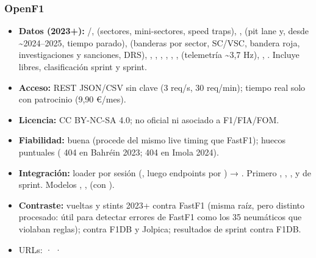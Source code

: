\subsubsection{OpenF1}

\begin{itemize}
\item \textbf{Datos (2023+):} /,  (sectores, mini-sectores, speed traps), ,  (pit lane y, desde \textasciitilde{}2024–2025, tiempo parado),  (banderas por sector, SC/VSC, bandera roja, investigaciones y sanciones, DRS), , , , , , ,  (telemetría \textasciitilde{}3,7 Hz), , . Incluye libres, clasificación sprint y sprint.
\item \textbf{Acceso:} REST JSON/CSV sin clave (3 req/s, 30 req/min); tiempo real solo con patrocinio (9,90 €/mes).
\item \textbf{Licencia:} CC BY-NC-SA 4.0; no oficial ni asociado a F1/FIA/FOM.
\item \textbf{Fiabilidad:} buena (procede del mismo live timing que FastF1); huecos puntuales ( 404 en Bahréin 2023;  404 en Imola 2024).
\item \textbf{Integración:} loader por sesión (, luego endpoints por ) → . Primero , , ,  y  de sprint. Modelos , ,  (con ).
\item \textbf{Contraste:} vueltas y stints 2023+ contra FastF1 (misma raíz, pero distinto procesado: útil para detectar errores de FastF1 como los 35 neumáticos que violaban reglas);  contra F1DB y Jolpica; resultados de sprint contra F1DB.
\item URLs: \href{https://openf1.org/}{} · \href{https://openf1.org/docs/}{} · \href{https://api.openf1.org/v1/sessions}{}
\end{itemize}

